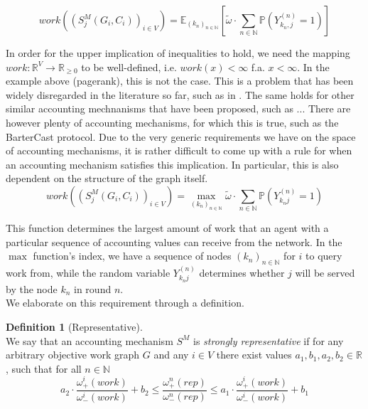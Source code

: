 \documentclass[11pt,a4paper]{article}
\theoremstyle{definition}
\newtheorem{definition}{Definition}[section]
\theoremstyle{theorem}
\theoremstyle{proposition}
\theoremstyle{corollary}
\theoremstyle{lemma}
\theoremstyle{example}
\theoremstyle{remark}
\begin{document}
\[
work\left((S^M_j(G_i,C_i))_{i\in{}V}\right) = \mathbb{E}_{(k_n)_{n\in\mathbb{N}}}[\tilde{\omega}\cdot\sum\limits_{n\in\mathbb{N}}\mathbb{P}(Y^{(n)}_{k_n,j}=1)]
\]





\noindent{}In order for the upper implication of inequalities to hold, we need the mapping $work:\mathbb{R}^{V}\rightarrow\mathbb{R}_{\geq{}0}$ to be well-defined, i.e. $work(x)<\infty$ f.a. $x<\infty$. In the example above (pagerank), this is not the case. This is a problem that has been widely disregarded in the literature so far, such as in \cite{A Random Walk Based Trust Ranking in Distributed Systems}. The same holds for other similar accounting mechnanisms that have been proposed, such as ... There are however plenty of accounting mechanisms, for which this is true, such as the BarterCast protocol. Due to the very generic requirements we have on the space of accounting mechanisms, it is rather difficult to come up with a rule for when an accounting mechanism satisfies this implication. In particular, this is also dependent on the structure of the graph itself. \vspace{1em}\\


\[
work\left((S^M_j(G_i,C_i))_{i\in{}V}\right) = \max\limits_{(k_n)_{n\in\mathbb{N}}}\tilde{\omega}\cdot{}\sum\limits_{n\in\mathbb{N}}\mathbb{P}(Y^{(n)}_{k_nj}=1)
\]

\noindent{}This function determines the largest amount of work that an agent with a particular sequence of accounting values can receive from the network. In the $\max$ function's index, we have a sequence of nodes $(k_n)_{n\in\mathbb{N}}$ for $i$ to query work from, while the random variable $Y^{(n)}_{k_nj}$ determines whether $j$ will be served by the node $k_n$ in round $n$. \vspace{1em}\\


\noindent{}We elaborate on this requirement through a definition.
\begin{definition}[Representative]\ \\
We say that an accounting mechanism $S^M$ is {\it strongly representative} if for any arbitrary objective work graph $G$ and any $i\in{}V$ there exist values $a_1,b_1,a_2,b_2\in\mathbb{R}$, such that for all $n\in\mathbb{N}$  
\[
a_2\cdot{}\frac{\omega^i_{+}(work)}{\omega^i_{-}(work)} + b_2 \leq \frac{\omega^n_{+}(rep)}{\omega^n_{-}(rep)} \leq a_1\cdot{}\frac{\omega^i_{+}(work)}{\omega^i_{-}(work)} + b_1
\]
\end{definition}
\end{document}
